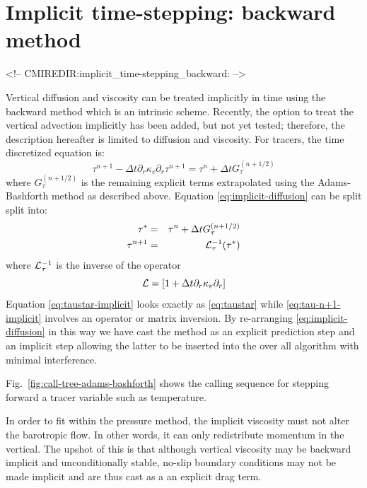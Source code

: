 \section{Implicit time-stepping: backward method}
\label{sec:implicit-backward-stepping}
\begin{rawhtml}
<!-- CMIREDIR:implicit_time-stepping_backward: -->
\end{rawhtml}

Vertical diffusion and viscosity can be treated implicitly in time
using the backward method which is an intrinsic scheme. 
Recently, the option to treat the vertical advection 
implicitly has been added, but not yet tested; therefore, 
the description hereafter is limited to diffusion and viscosity.
For tracers,
the time discretized equation is:
\begin{equation}
\tau^{n+1} - \Delta t \partial_r \kappa_v \partial_r \tau^{n+1} =
\tau^{n} + \Delta t G_\tau^{(n+1/2)}
\label{eq:implicit-diffusion}
\end{equation}
where $G_\tau^{(n+1/2)}$ is the remaining explicit terms extrapolated
using the Adams-Bashforth method as described above.  Equation
\ref{eq:implicit-diffusion} can be split split into:
\begin{eqnarray}
\tau^* & = & \tau^{n} + \Delta t G_\tau^{(n+1/2)}
\label{eq:taustar-implicit} \\
\tau^{n+1} & = & {\cal L}_\tau^{-1} ( \tau^* )
\label{eq:tau-n+1-implicit}
\end{eqnarray}
where ${\cal L}_\tau^{-1}$ is the inverse of the operator
\begin{equation}
{\cal L} = \left[ 1 + \Delta t \partial_r \kappa_v \partial_r \right]
\end{equation}
Equation \ref{eq:taustar-implicit} looks exactly as \ref{eq:taustar}
while \ref{eq:tau-n+1-implicit} involves an operator or matrix
inversion. By re-arranging \ref{eq:implicit-diffusion} in this way we
have cast the method as an explicit prediction step and an implicit
step allowing the latter to be inserted into the over all algorithm
with minimal interference.

Fig.~\ref{fig:call-tree-adams-bashforth} shows the calling sequence for
stepping forward a tracer variable such as temperature.

In order to fit within the pressure method, the implicit viscosity
must not alter the barotropic flow. In other words, it can only
redistribute momentum in the vertical. The upshot of this is that
although vertical viscosity may be backward implicit and
unconditionally stable, no-slip boundary conditions may not be made
implicit and are thus cast as a an explicit drag term.

